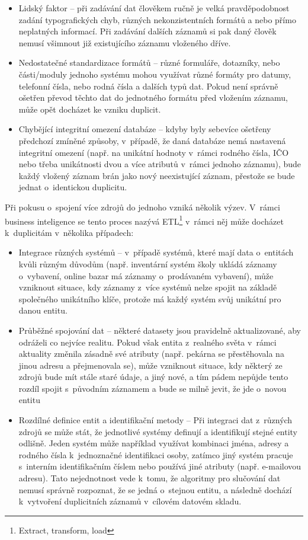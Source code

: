 \begin{itemize}
  \item Lidský faktor – při zadávání dat člověkem ručně je velká pravděpodobnost zadání typografických chyb, různých nekonzistentních formátů a nebo přímo neplatných informací. Při zadávání dalších záznamů si pak daný člověk nemusí všimnout již existujícího záznamu vloženého dříve.
  \item Nedostatečné standardizace formátů – různé formuláře, dotazníky, nebo části/moduly jednoho systému mohou využívat různé formáty pro datumy, telefonní čísla, nebo rodná čísla a dalších typů dat. Pokud není správně ošetřen převod těchto dat do jednotného formátu před vložením záznamu, může opět docházet ke vzniku duplicit.
  \item Chybějící integritní omezení databáze – kdyby byly sebevíce ošetřeny předchozí zmíněné způsoby, v~případě, že daná databáze nemá nastavená integritní omezení (např. na unikátní hodnoty v~rámci rodného čísla, IČO nebo třeba unikátnosti dvou a více atributů v~rámci jednoho záznamu), bude každý vložený záznam brán jako nový neexistující záznam, přestože se bude jednat o~identickou duplicitu.
\end{itemize}

Při pokusu o~spojení více zdrojů do jednoho vzniká několik výzev. V~rámci business inteligence se tento proces nazývá ETL\footnote{Extract, transform, load
} v~rámci něj může docházet k~duplicitám v~několika případech:

\begin{itemize}
  \item Integrace různých systémů – v~případě systémů, které mají data o~entitách kvůli různým důvodům (např. inventární systém školy ukládá záznamy o~vybavení, online bazar má záznamy o~prodávaném vybavení), může vzniknout situace, kdy záznamy z~více systémů nelze spojit na základě společného unikátního klíče, protože má každý systém svůj unikátní pro danou entitu.
  \item Průběžné spojování dat – některé datasety jsou pravidelně aktualizované, aby odráželi co nejvíce realitu. Pokud však entita z~realného světa v~rámci aktuality změnila zásadně své atributy (např. pekárna se přestěhovala na jinou adresu a přejmenovala se), může vzniknout situace, kdy některý ze zdrojů bude mít stále staré údaje, a jiný nové, a tím pádem nepůjde tento rozdíl spojit s~původním záznamem a bude se milně jevit, že jde o~novou entitu
  \item Rozdílné definice entit a identifikační metody – Při integraci dat z~různých zdrojů se může stát, že jednotlivé systémy definují a identifikují stejné entity odlišně. Jeden systém může například využívat kombinaci jména, adresy a rodného čísla k~jednoznačné identifikaci osoby, zatímco jiný systém pracuje s~interním identifikačním číslem nebo používá jiné atributy (např. e-mailovou adresu). Tato nejednotnost vede k~tomu, že algoritmy pro slučování dat nemusí správně rozpoznat, že se jedná o~stejnou entitu, a následně dochází k~vytvoření duplicitních záznamů v~cílovém datovém skladu.
\end{itemize}

